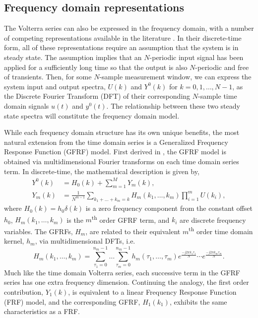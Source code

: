 \subsection{Frequency domain representations}

The Volterra series can also be expressed in the frequency domain, with a number of competing representations available in the literature \cite{Cheng2017}. In their discrete-time form, all of these representations require an assumption that the system is in steady state. The assumption implies that an $N$-periodic input signal has been applied for a sufficiently long time so that the output is also $N$-periodic and free of transients. Then, for some $N$-sample measurement window, we can express the system input and output spectra, $U(k)$ and $Y^0(k)$ for $k=0,1,\hdots,N-1$, as the Discrete Fourier Transform (DFT) of their corresponding $N$-sample time domain signals $u(t)$ and $y^0(t)$. The relationship between these two steady state spectra will constitute the frequency domain model.

While each frequency domain structure has its own unique benefits, the most natural extension from the time domain series is a Generalized Frequency Response Function (GFRF) model. First derived in \cite{George1959}, the GFRF model is obtained via multidimensional Fourier transforms on each time domain series term. In discrete-time, the mathematical description is given by,
\begin{equation}
\begin{split}
Y^0(k) &= H_0(k) + \sum_{m=1}^{M} Y_m(k),  \\
Y_m(k) &= \frac{1}{N^{m-1}} \sum_{k_1 + \hdots + k_m = k} H_m(k_1, \hdots,k_m) \prod_{i=1}^{m} U(k_i), 
\end{split}
\label{eqn:GFRFoutputeqn}
\end{equation}
where $H_0(k) = h_0 \delta(k)$ is a zero frequency component from the constant offset $h_0$, $H_m(k_1, \hdots,k_m)$ is the $m$\textsuperscript{th} order GFRF term, and $k_i$ are discrete frequency variables. The GFRFs, $H_m$, are related to their equivalent $m$\textsuperscript{th} order time domain kernel, $h_m$, via multidimensional DFTs, i.e.
\begin{equation}
\label{eqn:GFRF_Transform}
H_m(k_1, \hdots,k_m) = \sum_{\tau_1=0}^{n_m - 1} \hdots \sum_{\tau_m=0}^{n_m-1} h_m(\tau_1,\hdots,\tau_m) e^{\frac{-j2 \pi k_1 \tau_1}{N}} \cdots e^{\frac{-j2 \pi k_m \tau_m}{N}}.
\end{equation}
Much like the time domain Volterra series, each successive term in the GFRF series has one extra frequency dimension. Continuing the analogy, the first order contribution, $Y_1(k)$, is equivalent to a linear Frequency Response Function (FRF) model, and the corresponding GFRF, $H_1(k_1)$, exhibits the same characteristics as a FRF.

